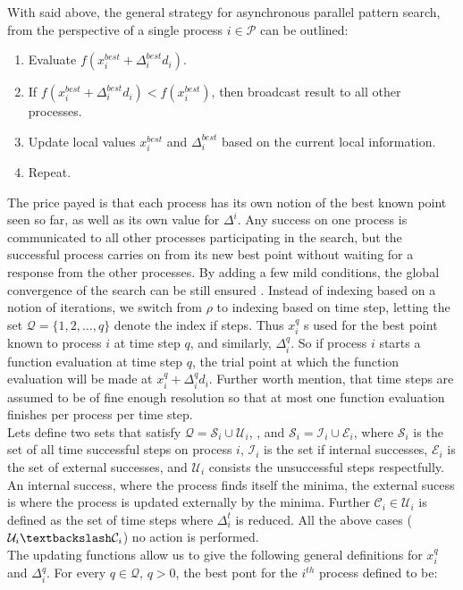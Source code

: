  With said above, the general strategy for asynchronous parallel pattern search, from the perspective of a single process $i\in\mathcal{P}$ can be outlined:
		\begin{enumerate}
		\item Evaluate $f(x^{best}_i+\Delta^{best}_id_i)$.
		\item If $f(x^{best}_i+\Delta^{best}_id_i) <f(x^{best}_i)$, then broadcast result to all other processes.
		\item Update local values $x^{best}_i$ and $\Delta^{best}_i$ based on the current local information.
		\item Repeat.
		\end{enumerate}
	The price payed is that each process has its own notion of the best known point seen so far, as well as its own value for	$\Delta^i$. Any success on one process is communicated to all other processes participating in the search, but the successful process carries on from its new best point without waiting for a response from the other processes. By adding a few mild conditions, the global convergence of the search can be still ensured \cite{kolda2003understanding}.  Instead of indexing based on a notion of iterations, we switch from $\rho$ to indexing based on time step, letting the set $\mathcal{Q}=\{1,2,\dots,q\}$ denote the index if steps. Thus $x_i^q$ s used for the best point known to process $i$ at time step $q$, and similarly, $\Delta_i^q$.  So if process $i$ starts a function evaluation at time step $q$, the trial point at which the function evaluation will be made at $x^{q}_i+\Delta^{q}_id_i$. Further worth mention, that time steps are assumed to be of fine enough resolution so that at most one function evaluation finishes per process per time step.\\
	Lets define two sets that satisfy $\mathcal{Q}=\mathcal{S}_i\cup\mathcal{U}_i$, , and $\mathcal{S}_i=\mathcal{I}_i\cup\mathcal{E}_i$, where $\mathcal{S}_i$ is the set of all time successful steps on process $i$, $\mathcal{I}_i$ is the set if internal successes, $\mathcal{E}_i$ is the set of external successes,   and $\mathcal{U}_i$ consists the unsuccessful steps respectfully. An internal success, where the process finds itself the minima, the external sucess is where the process is updated externally by the minima. Further  $\mathcal{C}_i\in\mathcal{U}_i$ is defined as the set of time steps where $\Delta^t_i$ is reduced. All the above cases ($\mathcal{U}_i\textbackslash\mathcal{C}_i$) no action is performed.\\
	The updating functions allow us to give the following general definitions for $x_i^q$ and $\Delta^q_i$. For every $q\in\mathcal{Q}$, $q>0$, the best pont for the $i^{th}$ process defined to be:
	
